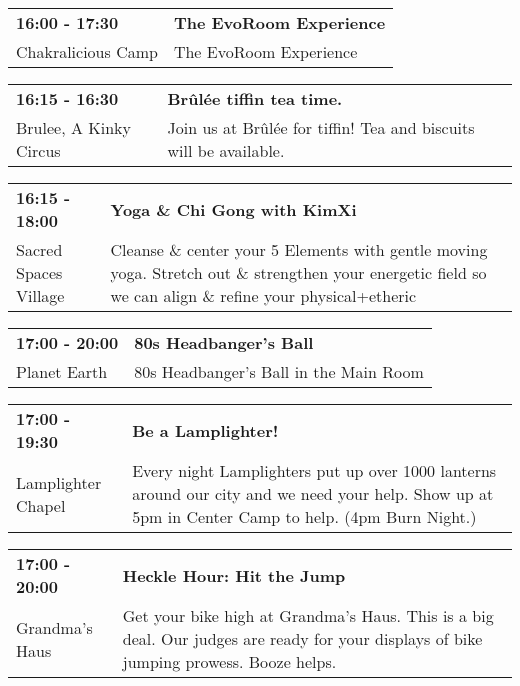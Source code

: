 \begin{tabular}{ p{1in} p{2.2in} }
    \textbf{16:00 - 17:30} & \textbf{The EvoRoom Experience} \\
    Chakralicious Camp \newline  & The EvoRoom Experience \\
    \hline 
\end{tabular}
    
\begin{tabular}{ p{1in} p{2.2in} }
    \textbf{16:15 - 16:30} & \textbf{Br\^ul\'ee tiffin tea time.} \\
    Brulee, A Kinky Circus \newline  & Join us at Br\^ul\'ee for tiffin! Tea and biscuits will be available. \\
    \hline 
\end{tabular}
    
\begin{tabular}{ p{1in} p{2.2in} }
    \textbf{16:15 - 18:00} & \textbf{Yoga \& Chi Gong with KimXi} \\
    Sacred Spaces Village \newline  & Cleanse \& center your 5 Elements with gentle moving yoga. Stretch out \& strengthen your energetic field so we can align \& refine your physical+etheric \\
    \hline 
\end{tabular}
    
\begin{tabular}{ p{1in} p{2.2in} }
    \textbf{17:00 - 20:00} & \textbf{80s Headbanger's Ball} \\
    Planet Earth \newline  & 80s Headbanger's Ball in the Main Room \\
    \hline 
\end{tabular}
    
\begin{tabular}{ p{1in} p{2.2in} }
    \textbf{17:00 - 19:30} & \textbf{Be a Lamplighter!} \\
    Lamplighter Chapel \newline  & Every night Lamplighters put up over 1000 lanterns around our city and we need your help. Show up at 5pm in Center Camp to help. (4pm Burn Night.) \\
    \hline 
\end{tabular}
    
\begin{tabular}{ p{1in} p{2.2in} }
    \textbf{17:00 - 20:00} & \textbf{Heckle Hour: Hit the Jump} \\
    Grandma's Haus \newline  & Get your bike high at Grandma's Haus. This is a big deal. Our judges are ready for your displays of bike jumping prowess. Booze helps. \\
    \hline 
\end{tabular}
    
